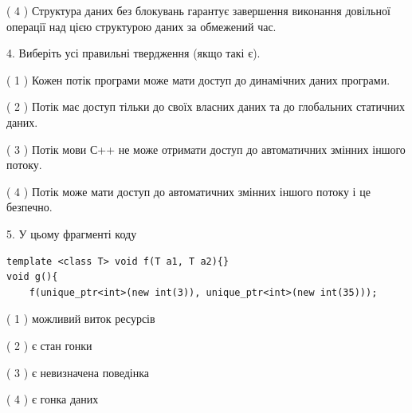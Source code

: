 \documentclass[12pt, ukrainian]{article}
\begin{document}
\begin {large}
{( 4 ) Структура даних без блокувань гарантує завершення виконання довільної операції над цією структурою даних за обмежений час.%


4. Виберіть усі правильні твердження (якщо такі є).\par
\vspace{2mm}

( 1 ) Кожен потік програми може мати доступ до динамічних даних програми.%

( 2 ) Потік має доступ тільки до своїх власних даних та до глобальних статичних даних.%

( 3 ) Потік мови С++ не може отримати доступ до автоматичних змінних іншого потоку.%

( 4 ) Потік може мати доступ до автоматичних змінних іншого потоку і це безпечно.%


5. У цьому фрагменті коду
\begin{verbatim}
template <class T> void f(T a1, T a2){}
void g(){
    f(unique_ptr<int>(new int(3)), unique_ptr<int>(new int(35)));
\end{verbatim}

( 1 ) можливий виток ресурсів%

( 2 ) є стан гонки%

( 3 ) є невизначена поведінка%

( 4 ) є гонка даних%
}
\end {large}
\end{document}
